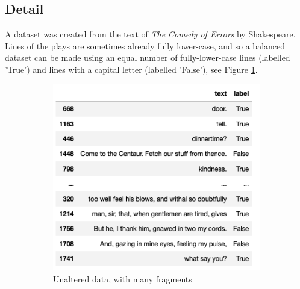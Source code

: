 \documentclass[a4paper, 11pt]{article}
\begin{document}
\subsection{Detail}

A dataset was created from the text of \emph{The Comedy of Errors} by Shakespeare.
Lines of the plays are sometimes already fully lower-case, and so a balanced dataset can be made using an equal number of fully-lower-case lines (labelled 'True') and lines with a capital letter (labelled 'False'), see Figure \ref{fig:unaltered-lines}.


        
\begin{figure}
\centering
\begin{subfigure}{0.49\textwidth}
    \includegraphics[width=\textwidth]{images/balanced-organic-comedy-of-errors-lines.png}
    \caption{Unaltered data, with many fragments}
    \label{fig:unaltered-lines}
\end{subfigure}
\hfill
\begin{subfigure}{0.49\textwidth}

\end{subfigure}
\end{figure}
\end{document}
